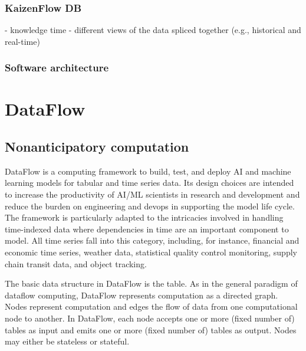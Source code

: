 \documentclass[11pt, reqno]{amsart}
\theoremstyle{definition}
\theoremstyle{remark}
\begin{document}
  \subsubsection{KaizenFlow DB}

  - knowledge time - different views of the data spliced together (e.g., historical
  and real-time)


  \subsubsection{Software architecture}


  \section{DataFlow}

  \subsection{Nonanticipatory computation}
DataFlow is a computing framework to build, test, and deploy AI and machine
learning models for tabular and time series data. Its design choices are
intended to increase the productivity of AI/ML scientists in research and
development and reduce the burden on engineering and devops in supporting the
model life cycle. The framework is particularly adapted to the intricacies
involved in handling time-indexed data where dependencies in time are an
important component to model. All time series fall into this category,
including, for instance, financial and economic time series, weather data,
statistical quality control monitoring, supply chain transit data, and object
tracking.

The basic data structure in DataFlow is the table. As in the general paradigm
of dataflow computing, DataFlow represents computation as a directed graph.
  Nodes represent computation and edges the flow of data from one computational
node to another. In DataFlow, each node accepts one or more (fixed number of)
tables as input and emits one or more (fixed number of) tables as output.
Nodes may either be stateless or stateful.
\end{document}

